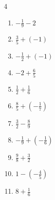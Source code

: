 \begin{multicols}{4}
\begin{enumerate}

  \item $\displaystyle -\frac{1}{9} - 2$


  \item $\displaystyle \frac{3}{5} + \left(-1\right)$


  \item $\displaystyle -\frac{1}{2} + \left(-1\right)$


  \item $\displaystyle -2 + \frac{6}{5}$


  \item $\displaystyle \frac{1}{2} + \frac{1}{6}$


  \item $\displaystyle \frac{8}{5} + \left(-\frac{1}{7}\right)$


  \item $\displaystyle \frac{3}{2} - \frac{8}{9}$


  \item $\displaystyle -\frac{1}{9} + \left(-\frac{1}{6}\right)$


  \item $\displaystyle \frac{9}{8} + \frac{3}{2}$


\columnbreak %

\resetques

  \item $\displaystyle 1 - \left(-\frac{4}{5}\right)$


  \item $\displaystyle 8 + \frac{1}{6}$



\end{enumerate}
\end{multicols}
